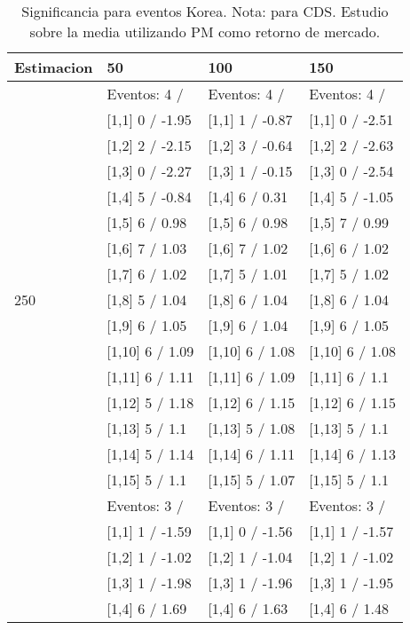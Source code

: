 \begin{table}

\caption{Significancia para eventos Korea. Nota: para CDS. Estudio sobre la media utilizando PM como retorno de mercado.}
\centering
\begin{tabular}[t]{llll}
\toprule
Estimacion & 50 & 100 & 150\\
\midrule
 & Eventos:  4 / & Eventos:  4 / & Eventos:  4 /\\
 & {}[1,1] 0  / -1.95 & {}[1,1] 1  / -0.87 & {}[1,1] 0  / -2.51\\
 & {}[1,2] 2  / -2.15 & {}[1,2] 3  / -0.64 & {}[1,2] 2  / -2.63\\
 & {}[1,3] 0  / -2.27 & {}[1,3] 1  / -0.15 & {}[1,3] 0  / -2.54\\
 & {}[1,4] 5  / -0.84 & {}[1,4] 6  / 0.31 & {}[1,4] 5  / -1.05\\
\addlinespace
 & {}[1,5] 6  / 0.98 & {}[1,5] 6  / 0.98 & {}[1,5] 7  / 0.99\\
 & {}[1,6] 7  / 1.03 & {}[1,6] 7  / 1.02 & {}[1,6] 6  / 1.02\\
 & {}[1,7] 6  / 1.02 & {}[1,7] 5  / 1.01 & {}[1,7] 5  / 1.02\\
250 & {}[1,8] 5  / 1.04 & {}[1,8] 6  / 1.04 & {}[1,8] 6  / 1.04\\
 & {}[1,9] 6  / 1.05 & {}[1,9] 6  / 1.04 & {}[1,9] 6  / 1.05\\
\addlinespace
 & {}[1,10] 6  / 1.09 & {}[1,10] 6  / 1.08 & {}[1,10] 6  / 1.08\\
 & {}[1,11] 6  / 1.11 & {}[1,11] 6  / 1.09 & {}[1,11] 6  / 1.1\\
 & {}[1,12] 5  / 1.18 & {}[1,12] 6  / 1.15 & {}[1,12] 6  / 1.15\\
 & {}[1,13] 5  / 1.1 & {}[1,13] 5  / 1.08 & {}[1,13] 5  / 1.1\\
 & {}[1,14] 5  / 1.14 & {}[1,14] 6  / 1.11 & {}[1,14] 6  / 1.13\\
\addlinespace
 & {}[1,15] 5  / 1.1 & {}[1,15] 5  / 1.07 & {}[1,15] 5  / 1.1\\
 & Eventos:  3 / & Eventos:  3 / & Eventos:  3 /\\
 & {}[1,1] 1  / -1.59 & {}[1,1] 0  / -1.56 & {}[1,1] 1  / -1.57\\
 & {}[1,2] 1  / -1.02 & {}[1,2] 1  / -1.04 & {}[1,2] 1  / -1.02\\
 & {}[1,3] 1  / -1.98 & {}[1,3] 1  / -1.96 & {}[1,3] 1  / -1.95\\
\addlinespace
 & {}[1,4] 6  / 1.69 & {}[1,4] 6  / 1.63 & {}[1,4] 6  / 1.48\\

\end{tabular}
\end{table}
